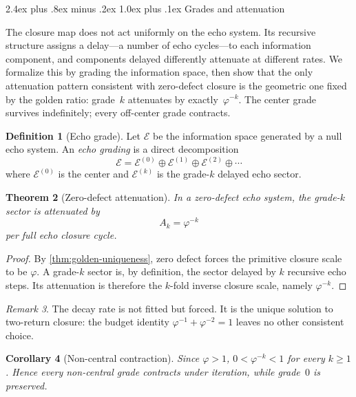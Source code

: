 \documentclass[11pt,a4paper]{article}
\makeatletter
\theoremstyle{plain}
\newtheorem{theorem}{Theorem}[section]
\newtheorem{corollary}[theorem]{Corollary}
\theoremstyle{definition}
\newtheorem{definition}[theorem]{Definition}
\theoremstyle{remark}
\newtheorem{remark}[theorem]{Remark}
\numberwithin{equation}{section}
\newcommand{\vp}{\varphi}
\newcommand{\EF}{\mathcal{E}}
\renewcommand{\subsection}{%
  \@startsection{subsection}{2}{0pt}%
    {2.4ex plus .8ex minus .2ex}%
    {1.0ex plus .1ex}%
    {\normalfont\Large\bfseries\color{headingAccent}}%
}
\makeatother
\begin{document}
\subsection{Grades and attenuation}

The closure map does not act uniformly on the echo system.  Its
recursive structure assigns a delay---a number of echo cycles---to
each information component, and components delayed differently
attenuate at different rates.  We formalize this by grading the
information space, then show that the only attenuation pattern
consistent with zero-defect closure is the geometric one fixed by
the golden ratio: grade~\(k\) attenuates by exactly~\(\vp^{-k}\).
The center grade survives indefinitely; every off-center grade
contracts.

\begin{definition}[Echo grade]
Let \(\EF\) be the information space generated by a null echo system.
An \emph{echo grading} is a direct decomposition
\[
  \EF=\EF^{(0)}\oplus\EF^{(1)}\oplus\EF^{(2)}\oplus\cdots
\]
where \(\EF^{(0)}\) is the center and \(\EF^{(k)}\) is the grade-\(k\)
delayed echo sector.
\end{definition}

\begin{theorem}[Zero-defect attenuation]
\label{ax:attenuation}
In a zero-defect echo system, the grade-\(k\) sector is attenuated by
\[
  A_k=\vp^{-k}
\]
per full echo closure cycle.
\end{theorem}

\begin{proof}
By \cref{thm:golden-uniqueness}, zero defect forces the primitive
closure scale to be \(\vp\).  A grade-\(k\) sector is, by definition, the
sector delayed by \(k\) recursive echo steps.  Its attenuation is
therefore the \(k\)-fold inverse closure scale, namely \(\vp^{-k}\).
\end{proof}

\begin{remark}
The decay rate is not fitted but forced.  It is the unique solution
to two-return closure: the budget identity
\(\vp^{-1}+\vp^{-2}=1\) leaves no other consistent choice.
\end{remark}

\begin{corollary}[Non-central contraction]
\label{thm:noncentral-contraction}
Since \(\vp>1\), \(0<\vp^{-k}<1\) for every \(k\ge 1\).  Hence
every non-central grade contracts under iteration, while grade~\(0\)
is preserved.
\end{corollary}
\end{document}
